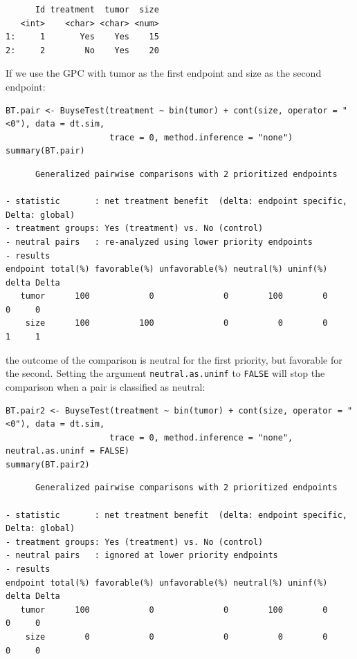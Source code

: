 \documentclass[12pt]{article}
\begin{document}
\begin{verbatim}
      Id treatment  tumor  size
   <int>    <char> <char> <num>
1:     1       Yes    Yes    15
2:     2        No    Yes    20
\end{verbatim}


\bigskip

If we use the GPC with tumor as the first endpoint and size as the
second endpoint:
\lstset{language=r,label= ,caption= ,captionpos=b,numbers=none}
\begin{lstlisting}
BT.pair <- BuyseTest(treatment ~ bin(tumor) + cont(size, operator = "<0"), data = dt.sim,
                     trace = 0, method.inference = "none")
summary(BT.pair)
\end{lstlisting}

\begin{verbatim}
      Generalized pairwise comparisons with 2 prioritized endpoints

- statistic       : net treatment benefit  (delta: endpoint specific, Delta: global) 
- treatment groups: Yes (treatment) vs. No (control) 
- neutral pairs   : re-analyzed using lower priority endpoints
- results
endpoint total(%) favorable(%) unfavorable(%) neutral(%) uninf(%) delta Delta
   tumor      100            0              0        100        0     0     0
    size      100          100              0          0        0     1     1
\end{verbatim}


the outcome of the comparison is neutral for the first priority, but
favorable for the second. Setting the argument \texttt{neutral.as.uninf} to
\texttt{FALSE} will stop the comparison when a pair is classified as neutral:
\lstset{language=r,label= ,caption= ,captionpos=b,numbers=none}
\begin{lstlisting}
BT.pair2 <- BuyseTest(treatment ~ bin(tumor) + cont(size, operator = "<0"), data = dt.sim,
                     trace = 0, method.inference = "none", neutral.as.uninf = FALSE)
summary(BT.pair2)
\end{lstlisting}

\begin{verbatim}
      Generalized pairwise comparisons with 2 prioritized endpoints

- statistic       : net treatment benefit  (delta: endpoint specific, Delta: global) 
- treatment groups: Yes (treatment) vs. No (control) 
- neutral pairs   : ignored at lower priority endpoints
- results
endpoint total(%) favorable(%) unfavorable(%) neutral(%) uninf(%) delta Delta
   tumor      100            0              0        100        0     0     0
    size        0            0              0          0        0     0     0
\end{verbatim}
\end{document}

